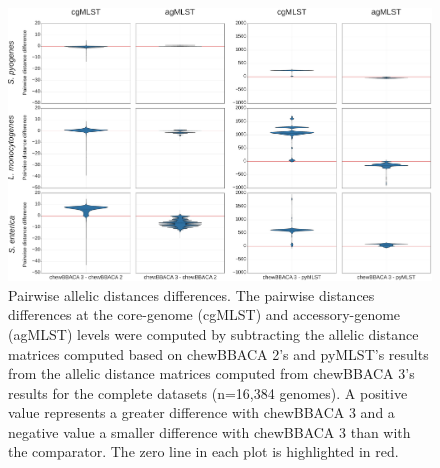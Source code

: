 \newpage
\begin{figure}[h!]
    \centering
    \includegraphics[angle=0,width=\textwidth]{figures/chapter 2/FigureS14.pdf}
    \caption{Pairwise allelic distances differences. The pairwise distances differences at the core-genome (cgMLST) and accessory-genome (agMLST) levels were computed by subtracting the allelic distance matrices computed based on chewBBACA 2's and pyMLST's results from the allelic distance matrices computed from chewBBACA 3's results for the complete datasets (n=16,384 genomes). A positive value represents a greater difference with chewBBACA 3 and a negative value a smaller difference with chewBBACA 3 than with the comparator. The zero line in each plot is highlighted in red.}
    \label{fig:chap2_figureS14}
\end{figure}

